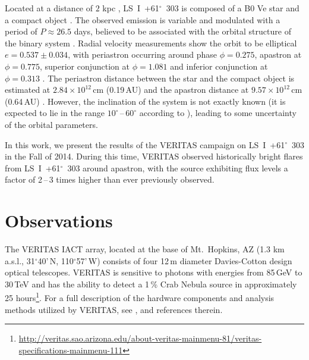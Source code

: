 \documentclass[preprint2]{aastex}
\newcommand{\tapp}{\raisebox{0.5ex}{\texttildelow}}
\newcommand{\lsi}{LS~I~+61$^{\circ}$~303}
\newcommand{\gev}{\,GeV}
\newcommand{\tev}{\,TeV}
\begin{document}
Located at a distance of \tapp{}$2$ kpc \citep{1991AJ....101.2126F}, \lsi{} is composed of a B0 Ve star and a compact object \citep{HandC1981, Casares2005}. The observed emission is variable and modulated with a period of $P \approx 26.5$ days, believed to be associated with the orbital structure of the binary system \citep{Albert2006, Esposito2007, VERITASLSIDetection, Abdo2009, LiXray, 2015A&A...575L...9M}. Radial velocity measurements show the orbit to be elliptical $e = 0.537\pm0.034$, with periastron occurring around phase $\phi=0.275$, apastron at $\phi=0.775$, superior conjunction at $\phi=1.081$ and inferior conjunction at $\phi=0.313$ \citep{Aragona2009}. The periastron distance between the star and the compact object is estimated at $2.84 \times 10^{12}$\,cm (0.19\,AU) and the apastron distance at $9.57 \times 10^{12}$\,cm (0.64\,AU) \citep{2013A&ARv..21...64D}. However, the inclination of the system is not exactly known (it is expected to lie in the range $10^\circ$\,--\,$60^\circ$ according to \citet{2013A&ARv..21...64D}), leading to some uncertainty of the orbital parameters.


In this work, we present the results of the VERITAS campaign on \lsi{} in the Fall of 2014. During this time, VERITAS observed historically bright flares from \lsi{} around apastron, with the source exhibiting flux levels a factor of 2\,--\,3 times higher than ever previously observed.

\section{Observations}
The VERITAS IACT array, located at the base of Mt.\ Hopkins, AZ (1.3 km a.s.l., 31$^{\circ}$40'\,N, 110$^{\circ}$57'\,W) consists of four 12\,m diameter Davies-Cotton design optical telescopes. VERITAS is sensitive to photons with energies from 85\gev{} to 30\tev{} and has the ability to detect a 1\,\% Crab Nebula source in approximately 25 hours\footnote{\url{http://veritas.sao.arizona.edu/about-veritas-mainmenu-81/veritas-specifications-mainmenu-111}}. For a full description of the hardware components and analysis methods utilized by VERITAS, see \citet{VERITAS, KiedaVTSUpgrade, VERITASLSIDetection}, and references therein.
\end{document}
